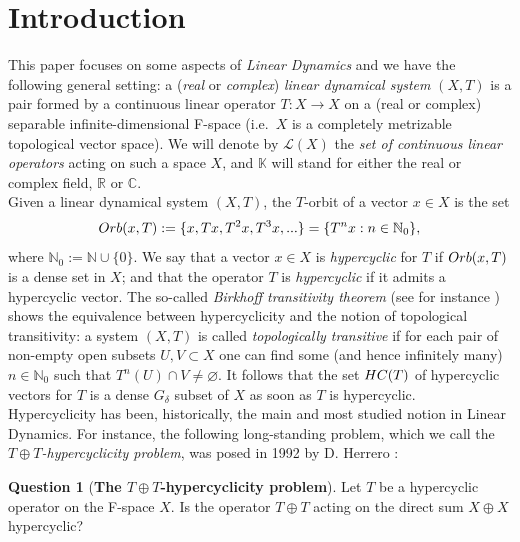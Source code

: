 \documentclass[openright,11pt]{article}
\theoremstyle{plain}
\theoremstyle{definition}
\newtheorem{question}[theorem]{Question}
\newcommand{\NN}{\mathbb{N}}
\newcommand{\RR}{\mathbb{R}}
\newcommand{\CC}{\mathbb{C}}
\newcommand{\KK}{\mathbb{K}}
\newcommand{\Lc}{\mathcal{L}}
\newcommand{\HC}{\textup{HC}}
\newcommand{\orb}{\textup{Orb}}
\begin{document}
\vspace*{-0.2cm}

\section{Introduction}

This paper focuses on some aspects of {\em Linear Dynamics} and we have the following general setting: a ({\em real} or {\em complex}) {\em linear dynamical system} $(X,T)$ is a pair formed by a continuous linear operator $T:X\longrightarrow X$ on a (real or complex) separable infinite-dimensional F-space (i.e.\ $X$ is a completely metrizable topological vector space). We will denote by $\Lc(X)$ the {\em set of continuous linear operators} acting on such a space $X$, and $\KK$ will stand for either the real or complex field, $\RR$ or $\CC$.\\[-5pt]

Given a linear dynamical system $(X,T)$, the $T$-orbit of a vector $x \in X$ is the set
\[
\orb(x,T) := \{ x, Tx, T^2x, T^3x, ...\} = \{ T^nx : n \in \NN_0 \},
\]
where $\NN_0:=\NN\cup\{0\}$. We say that a vector $x \in X$ is {\em hypercyclic} for $T$ if $\orb(x,T)$ is a dense set in $X$; and that the operator $T$ is {\em hypercyclic} if it admits a hypercyclic vector. The so-called {\em Birkhoff transitivity theorem} (see for instance \cite[Theorem~1.2]{BaMa2009_book}) shows the equivalence between hypercyclicity and the notion of  topological transitivity: a system $(X,T)$ is called {\em topologically transitive} if for each pair of non-empty open subsets $U,V \subset X$ one can find some (and hence infinitely many) $n \in \NN_0$ such that $T^n(U) \cap V \neq \varnothing$. It follows that the set $\HC(T)$ of hypercyclic vectors for $T$ is a dense $G_{\delta}$ subset of $X$ as soon as $T$ is hypercyclic.\\[-5pt]

Hypercyclicity has been, historically, the main and most studied notion in Linear Dynamics. For instance, the following long-standing problem, which we call the {\em $T\oplus T$-hypercyclicity problem}, was posed in 1992 by D. Herrero \cite{Herrero1991}:

\begin{question}[\textbf{The $T\oplus T$-hypercyclicity problem}]\label{Q:T+T-hyp}
	Let $T$ be a hypercyclic operator on the F-space $X$. Is the operator $T\oplus T$ acting on the direct sum $X\oplus X$ hypercyclic?
\end{question}
\end{document}
